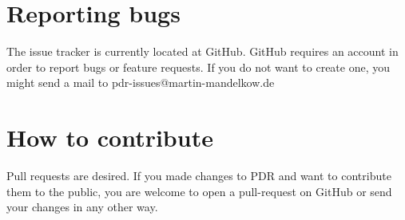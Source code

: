 \documentclass[12pt,a4paper,titlepage]{report}
\begin{document}
\section{Reporting bugs}
The issue tracker is currently located at GitHub.
GitHub requires an account in order to report bugs or feature requests. If you do not want to create one, you might send a mail to pdr-issues@martin-mandelkow.de
\section{How to contribute}
Pull requests are desired. If you made changes to PDR and want to contribute them to the public, you are welcome to open a pull-request on GitHub or send your changes in any other way.




\end{document}
